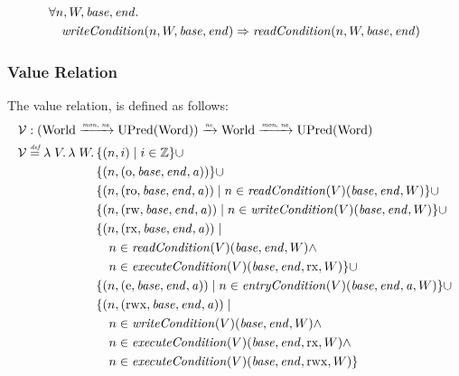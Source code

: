 \documentclass[a4paper]{article}
\newcommand{\monnefun}{\xrightarrow{\textit{\tiny{mon, ne}}}}
\newcommand{\nefun}{\xrightarrow{\textit{\tiny{ne}}}}
\newcommand{\defeq}{\stackrel{\textit{\tiny{def}}}{=}}
\newcommand{\union}{\mathbin{\cup}}
\newcommand{\var}[1]{\mathit{#1}}
\newcommand{\gl}{\var{g}}
\newcommand{\addr}{\var{a}}
\newcommand{\start}{\var{base}}
\newcommand{\addrend}{\var{end}}
\newcommand{\perm}{\var{perm}}
\newcommand{\stdcap}[1][(\perm,\gl)]{\left(#1,\start,\addrend,\addr \right)}
\newcommand{\plainfun}[2]{
  \ifthenelse{\equal{#2}{}}
             {\mathit{#1}}
             {\mathit{#1}(#2)}
}
\newcommand{\readCond}[1]{\plainfun{readCondition}{#1}}
\newcommand{\writeCond}[1]{\plainfun{writeCondition}{#1}}
\newcommand{\execCond}[1]{\plainfun{executeCondition}{#1}}
\newcommand{\entryCond}[1]{\plainfun{entryCondition}{#1}}
\newcommand{\asmType}{\plaindom{AsmType}}
\newcommand{\plaindom}[1]{\mathrm{#1}}
\newcommand{\Words}{\plaindom{Word}}
\newcommand{\ints}{\mathbb{Z}}
\newcommand{\Worlds}{\plaindom{World}}
\newcommand{\UPred}[1]{\plaindom{UPred}(#1)}
\newcommand{\intr}[2]{\mathcal{#1}}
\newcommand{\valueintr}[1]{\intr{V}{#1}}
\newcommand{\stdvr}{\valueintr{\asmType}}
\newcommand{\npair}[2][n]{\left(#1,#2 \right)}
\newcommand{\plainperm}[1]{\mathrm{#1}}
\newcommand{\noperm}{\plainperm{o}}
\newcommand{\readonly}{\plainperm{ro}}
\newcommand{\readwrite}{\plainperm{rw}}
\newcommand{\exec}{\plainperm{rx}}
\newcommand{\entry}{\plainperm{e}}
\newcommand{\rwx}{\plainperm{rwx}}
\begin{document}
\begin{lemma}
\label{lem:wc-implies-rc}
  \begin{align*}
    &\forall n, W, \start, \addrend \ldotp\\ 
    &\quad \writeCond{n,W,\start,\addrend} \Rightarrow \readCond{n,W,\start,\addrend}
  \end{align*}
\end{lemma}


\subsubsection{Value Relation}
\label{subsubsec:value-relation}
The value relation, is defined as follows:
\begin{align*}
  \stdvr & :  (\Worlds \monnefun \UPred{\Words}) \nefun \Worlds \monnefun \UPred{\Words} \\
  \stdvr &\defeq \lambda \; V \ldotp \lambda \; W \ldotp 
              \begin{aligned}[t]
  & \{ \npair{i} \mid i \in \ints \} 
    \union \\
         & \{ \npair{\stdcap[\noperm] }  \} 
           \union \\
         & \{ \npair{\stdcap[\readonly] } \mid n \in \readCond{}(V)(\start,\addrend,W) \} \union \\
         & \{ \npair{\stdcap[\readwrite] } \mid n \in \writeCond{}(V)(\start,\addrend,W) \} \union \\
         & \{ \npair{\stdcap[\exec]} \mid \\
         & \quad n \in \readCond{}(V)(\start,\addrend,W) \land \\
         & \quad n \in \execCond{}(V)(\start,\addrend,\exec,W) \}
           \union \\
         & \{ \npair{\stdcap[\entry]} \mid n \in \entryCond{}(V)(\start,\addrend,\addr,W) \} \union \\
         & \{ \npair{\stdcap[\rwx]} \mid \\
         & \quad n \in \writeCond{}(V)(\start,\addrend,W) \land \\
         & \quad n \in \execCond{}(V)(\start,\addrend,\exec,W) \land \\
         & \quad n \in \execCond{}(V)(\start,\addrend,\rwx,W) \}
       \end{aligned}
\end{align*}
\end{document}
